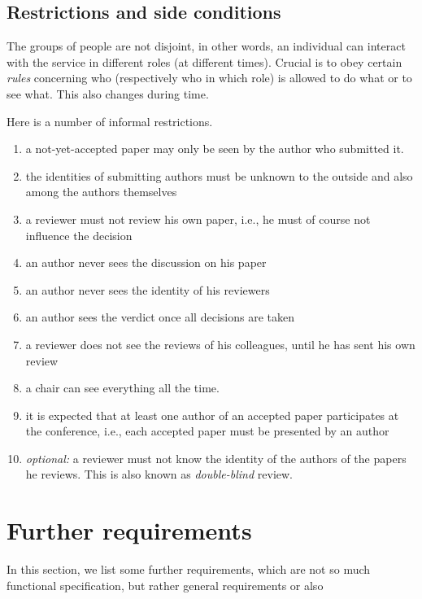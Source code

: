\subsection{Restrictions and side conditions}
\label{sec:restrictions}


The groups of people are not disjoint, in other words, an individual can
interact with the service in different roles (at different times).  Crucial
is to obey certain \emph{rules} concerning who (respectively who in which
role) is allowed to do what or to see what. This also changes during time.

Here is a number of informal restrictions.

\begin{enumerate}
\item a not-yet-accepted paper may only be seen by the author who submitted
  it.
\item the identities of submitting authors must be unknown to the outside
  and also among the authors themselves
\item a reviewer must not review his own paper, i.e., he must of course not
  influence the decision
\item an author never sees the discussion on his paper
\item an author never sees the identity of his reviewers
\item an author sees the verdict once all decisions are taken
\item a reviewer does not see the reviews of his colleagues, until he has
  sent his own review
\item a chair can see everything all the time.
\item it is expected that at least one author of an accepted paper
  participates at the conference, i.e., each accepted paper must be
  presented by an author
\item \emph{optional:} a reviewer must not know the identity of the authors
  of the papers he reviews. This is also known as \emph{double-blind}
  review.
\end{enumerate}






\section{Further requirements}
\label{sec:further}

In this section, we list some further requirements, which are not so much
functional specification, but rather general requirements or also 


